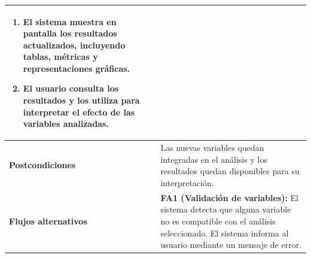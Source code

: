 \begin{longtable}{|p{4cm}|p{10cm}|}
\begin{enumerate}
    \item El sistema muestra en pantalla los resultados actualizados, incluyendo tablas, métricas y representaciones gráficas.
    
    \item El usuario consulta los resultados y los utiliza para interpretar el efecto de las variables analizadas.
\end{enumerate} \\ \hline

\textbf{Postcondiciones} & 
Las nuevas variables quedan integradas en el análisis y los resultados quedan disponibles para su interpretación. \\ \hline

\textbf{Flujos alternativos} & 
\textbf{FA1 (Validación de variables):} El sistema detecta que alguna variable no es compatible con el análisis seleccionado. El sistema informa al usuario mediante un mensaje de error. \\ \hline

\end{longtable}
    \newpage
